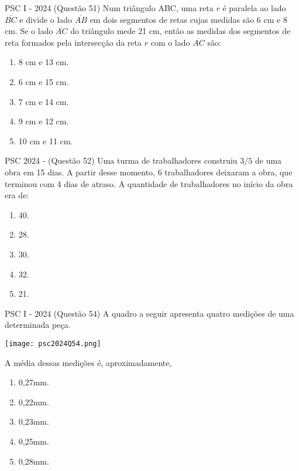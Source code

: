 \documentclass[aspectratio=169]{beamer}
\newif\ifusarcorvermelha
\newcommand{\vermelho}[1]{%
    \ifusarcorvermelha
        {\color{red}#1}%
    \else
        #1%
    \fi
}
\begin{document}
    \begin{frame}{PSC I - 2024 (Questão 51)}
        Num triângulo ABC, uma reta $r$ é paralela ao lado $\overline{BC}$ e divide o lado $\overline{AB}$ em dois segmentos de retas cujas medidas são 6 cm e 8 cm. Se o lado $\overline{AC}$ do triângulo mede 21 cm, então as medidas dos segmentos de reta formados pela intersecção da reta $r$ com o lado $\overline{AC}$ são:

        
        \begin{enumerate}[a]
            \item 8 cm e 13 cm.
            \item 6 cm e 15 cm.
            \item 7 cm e 14 cm.
            \item \vermelho{9 cm e 12 cm.} %
            \item 10 cm e 11 cm.
        \end{enumerate}
      
    \end{frame}


    \begin{frame}{PSC 2024 - (Questão 52)}
        Uma turma de trabalhadores construiu ${3}/{5}$ de uma obra em 15 dias. A partir desse momento, 6 trabalhadores deixaram a obra, que terminou com 4 dias de atraso. A quantidade de trabalhadores no início da obra era de:

            \begin{enumerate}[a]
                \item 40.
                \item 28.
                \item 30.
                \item 32.
                \item \vermelho{21.} %
            \end{enumerate}
    
    \end{frame}


    \begin{frame}{PSC I - 2024 (Questão 54)}
        A quadro a seguir apresenta quatro medições de uma determinada peça. 

        \begin{center}
            \texttt{[image: psc2024Q54.png]}
        \end{center} A média dessas medições é, aproximadamente,
        
            \begin{enumerate}[a]
                \item 0,27mm.
                \item 0,22mm.
                \item 0,23mm.
                \item \vermelho{0,25mm.} %
                \item 0,28mm.
            \end{enumerate}
    
    \end{frame}
\end{document}
